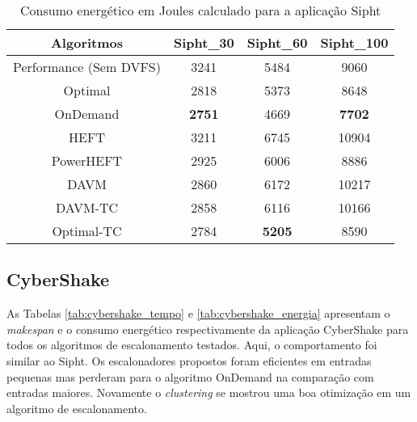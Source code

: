 \begin{table}
	\centering
    \begin{tabular}{c|ccc}
    \hline
    \textbf{Algoritmos}   & \textbf{Sipht\_30} & \textbf{Sipht\_60} & \textbf{Sipht\_100} \\ \hline
    Performance (Sem DVFS) & 3241     & 5484     & 9060      \\
    \cite{guerout:energy_aware_simulation} Optimal      & 2818     & 5373     & 8648      \\
    \cite{guerout:energy_aware_simulation} OnDemand     & \textbf{2751}     & 4669     & \textbf{7702}      \\
    HEFT                   & 3211     & 6745     & 10904     \\
    PowerHEFT              & 2925     & 6006     & 8886      \\
    DAVM                   & 2860     & 6172     & 10217     \\
    DAVM-TC                & 2858     & 6116     & 10166     \\
    Optimal-TC             & 2784     & \textbf{5205}     & 8590      \\ \hline
    \end{tabular}
    \caption{Consumo energético em Joules calculado para a aplicação Sipht}
    \label{tab:sipht_energia}
\end{table}


\subsection{CyberShake} %
\label{sub:cybershake}

As Tabelas \ref{tab:cybershake_tempo} e \ref{tab:cybershake_energia} apresentam o
\emph{makespan} e o consumo energético respectivamente da aplicação CyberShake para
todos os algoritmos de escalonamento testados. Aqui, o comportamento foi similar
ao Sipht. Os escalonadores propostos foram eficientes em entradas pequenas mas
perderam para o algoritmo OnDemand na comparação com entradas maiores. Novamente
o \emph{clustering} se mostrou uma boa otimização em um algoritmo de
escalonamento.


